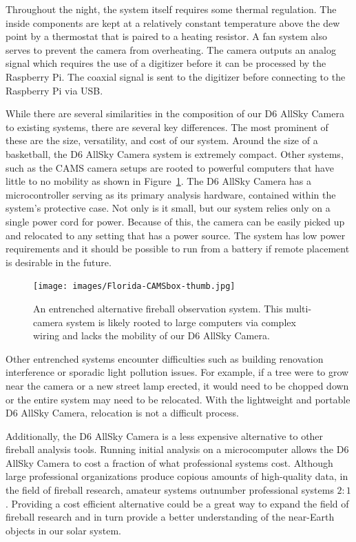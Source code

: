 Throughout the night, the system itself requires some thermal regulation.
The inside components are kept at a relatively constant temperature above the dew point by a thermostat that is paired to a heating resistor.  
A fan system also serves to prevent the camera from overheating.
The camera outputs an analog signal which requires the use of a digitizer before it can be processed by the Raspberry Pi.
The coaxial signal is sent to the digitizer before connecting to the Raspberry Pi via USB.

While there are several similarities in the composition of our D6 AllSky Camera to existing systems, there are several key differences.
The most prominent of these are the size, versatility, and cost of our system.
Around the size of a basketball, the D6 AllSky Camera system is extremely compact.
Other systems, such as the CAMS camera setups are rooted to powerful computers that have little to no mobility as shown in Figure~\ref{immobile}.
The D6 AllSky Camera has a microcontroller serving as its primary analysis hardware, contained within the system's protective case.
Not only is it small, but our system relies only on a single power cord for power.  
Because of this, the camera can be easily picked up and relocated to any setting that has a power source.  
The system has low power requirements and it should be possible to run from a battery if remote placement is desirable in the future.

\begin{figure}[ht!]
  \centering
  \texttt{[image: images/Florida-CAMSbox-thumb.jpg]}
  \caption[An entrenched alternative fireball observation system.]{An entrenched alternative fireball observation system. This multi-camera system is likely rooted to large computers via complex wiring and lacks the mobility of our D6 AllSky Camera.}
  \label{immobile}
\end{figure}

Other entrenched systems encounter difficulties such as building renovation interference or sporadic light pollution issues.
For example, if a tree were to grow near the camera or a new street lamp erected, it would need to be chopped down or the entire system may need to be relocated.
With the lightweight and portable D6 AllSky Camera, relocation is not a difficult process.

Additionally, the D6 AllSky Camera is a less expensive alternative to other fireball analysis tools.
Running initial analysis on a microcomputer allows the D6 AllSky Camera to cost a fraction of what professional systems cost.
Although large professional organizations produce copious amounts of high-quality data, in the field of fireball research, amateur systems outnumber professional systems $2:1$ \cite{gural_review_2005}. 
Providing a cost efficient alternative could be a great way to expand the field of fireball research and in turn provide a better understanding of the near-Earth objects in our solar system.


